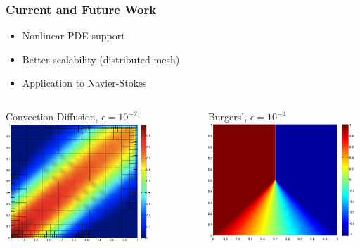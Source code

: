 \documentclass[mathserif]{beamer}
\begin{document}
\begin{frame}
\frametitle{Current and Future Work}
\begin{block}{}
\begin{itemize}
\item Nonlinear PDE support
\item Better scalability (distributed mesh)
\item Application to Navier-Stokes
\end{itemize}
\end{block}

\begin{columns}[c]
\begin{column}{5.5cm}
\begin{block}{Convection-Diffusion, $\epsilon=10^{-2}$}
\includegraphics[width=5.5cm]{confusionDemo.png}
\end{block}
\end{column}
\begin{column}{5.5cm}
\begin{block}{Burgers', $\epsilon=10^{-4}$}
\includegraphics[width=5.5cm]{burgers1e4.png}
\end{block}
\end{column}
\end{columns}
\end{frame}


\begin{frame}
\frametitle{}
\begin{block}{}
 \\
\\
\end{block}

\end{frame}

 
\end{document}
